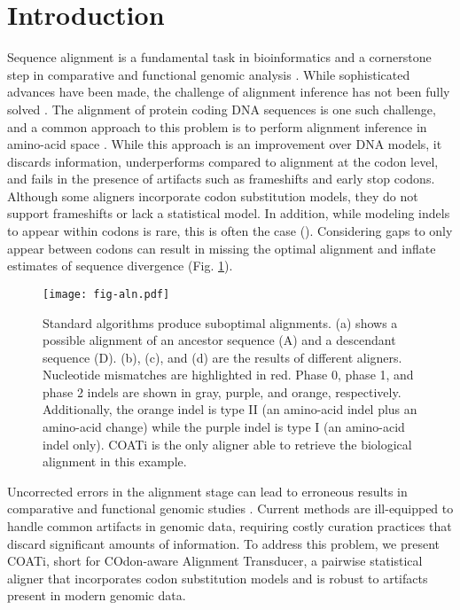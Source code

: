 \section*{Introduction}

Sequence alignment is a fundamental task in bioinformatics and a cornerstone step in comparative and functional genomic analysis \parencite{sequence_alignment_rosenberg_2009}. While sophisticated advances have been made, the challenge of alignment inference has not been fully solved \parencite{art_morrison_2015}.
%
The alignment of protein coding DNA sequences is one such challenge, and a common approach to this problem is to perform alignment inference in amino-acid space \parencite[e.g.][]{bininda2005transalign,abascal2010translatorx}.
While this approach is an improvement over DNA models, it discards information, underperforms compared to alignment at the codon level, and fails in the presence of artifacts such as frameshifts and early stop codons.
Although some aligners incorporate codon substitution models, they do not support frameshifts or lack a statistical model.
In addition, while modeling indels to appear within codons is rare, this is often the case ().
Considering gaps to only appear between codons can result in missing the optimal alignment and inflate estimates of sequence divergence (Fig. \ref{fig:aln}).

\begin{figure}[h!]
    \centering%
    \texttt{[image: fig-aln.pdf]}
    \par
    \caption{
        Standard algorithms produce suboptimal alignments.
        (a) shows a possible alignment of an ancestor sequence (A) and a descendant sequence (D).
        (b), (c), and (d) are the results of different aligners.
        Nucleotide mismatches are highlighted in red. Phase 0, phase 1, and phase 2 indels are shown in gray, purple, and orange, respectively.
        Additionally, the orange indel is type II (an amino-acid indel plus an amino-acid change) while the purple indel is type I (an amino-acid indel only).
        COATi is the only aligner able to retrieve the biological alignment in this example.
        }
    \label{fig:aln}
\end{figure}

Uncorrected errors in the alignment stage can lead to erroneous results in comparative and functional genomic studies \parencite{estimates_schneider_2009}.
Current methods are ill-equipped to handle common artifacts in genomic data, requiring costly curation practices that discard significant amounts of information.
To address this problem, we present COATi, short for COdon-aware Alignment Transducer, a pairwise statistical aligner that incorporates codon substitution models and is robust to artifacts present in modern genomic data.

